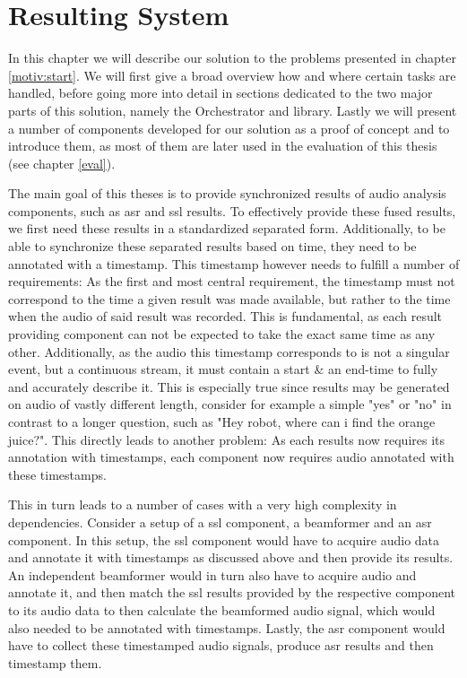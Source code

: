 \chapter{Resulting System}
\label{main:main}
In this chapter we will describe our solution to the problems presented in chapter \ref{motiv:start}.
We will first give a broad overview how and where certain tasks are handled, before going more into detail in sections dedicated to the two major parts of this solution, namely the Orchestrator and library.
Lastly we will present a number of components developed for our solution as a proof of concept and to introduce them, as most of them are later used in the evaluation of this thesis (see chapter \ref{eval}).

The main goal of this theses is to provide synchronized results of audio analysis components, such as \gls{asr} and \gls{ssl} results.
To effectively provide these fused results, we first need these results in a standardized separated form.
Additionally, to be able to synchronize these separated results based on time, they need to be annotated with a timestamp.
This timestamp however needs to fulfill a number of requirements:
As the first and most central requirement, the timestamp must not correspond to the time a given result was made available, but rather to the time when the audio of said result was recorded.
This is fundamental, as each result providing component can not be expected to take the exact same time as any other.
Additionally, as the audio this timestamp corresponds to is not a singular event, but a continuous stream, it must contain a start \& an end-time to fully and accurately describe it.
This is especially true since results may be generated on audio of vastly different length, consider for example a simple "yes" or "no" in contrast to a longer question, such as "Hey robot, where can i find the orange juice?".
This directly leads to another problem:
As each results now requires its annotation with timestamps, each component now requires audio annotated with these timestamps.

This in turn leads to a number of cases with a very high complexity in dependencies.
Consider a setup of a \gls{ssl} component, a beamformer and an \gls{asr} component.
In this setup, the \gls{ssl} component would have to acquire audio data and annotate it with timestamps as discussed above and then provide its results.
An independent beamformer would in turn also have to acquire audio and annotate it, and then match the \gls{ssl} results provided by the respective component to its audio data to then calculate the beamformed audio signal, which would also needed to be annotated with timestamps.
Lastly, the \gls{asr} component would have to collect these timestamped audio signals, produce \gls{asr} results and then timestamp them.

